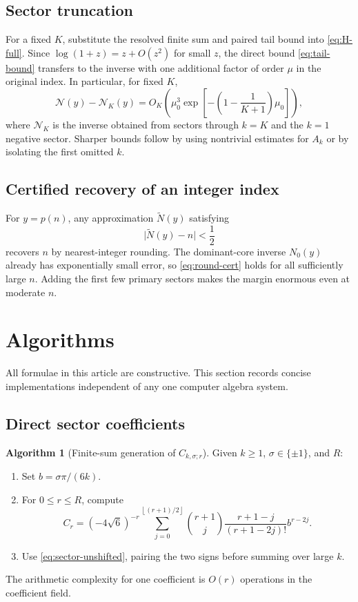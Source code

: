 \documentclass[11pt,a4paper]{article}
\numberwithin{equation}{section}
\theoremstyle{definition}
\newtheorem{algorithm}[theorem]{Algorithm}
\theoremstyle{remark}
\newcommand{\Ncal}{\mathcal N}
\newcommand{\abs}[1]{\lvert#1\rvert}
\newcommand{\floor}[1]{\left\lfloor#1\right\rfloor}
\begin{document}
\subsection{Sector truncation}

For a fixed $K$, substitute the resolved finite sum and paired tail bound into
\eqref{eq:H-full}.  Since $\log(1+z)=z+O(z^2)$ for small $z$, the direct bound
\eqref{eq:tail-bound} transfers to the inverse with one additional factor of
order $\mu$ in the original index.  In particular, for fixed $K$,
\begin{equation}\label{eq:inverse-K-bound}
 \Ncal(y)-\Ncal_K(y)
 =O_K\!\left(\mu_0^3
 \exp\!\left[-\left(1-\frac1{K+1}\right)\mu_0\right]\right),
\end{equation}
where $\Ncal_K$ is the inverse obtained from sectors through $k=K$ and the
$k=1$ negative sector.  Sharper bounds follow by using nontrivial estimates for
$A_k$ or by isolating the first omitted $k$.

\subsection{Certified recovery of an integer index}

For $y=p(n)$, any approximation $\widetilde N(y)$ satisfying
\begin{equation}\label{eq:round-cert}
 \abs{\widetilde N(y)-n}<\frac12
\end{equation}
recovers $n$ by nearest-integer rounding.  The dominant-core inverse $N_0(y)$
already has exponentially small error, so \eqref{eq:round-cert} holds for all
sufficiently large $n$.  Adding the first few primary sectors makes the margin
enormous even at moderate $n$.

\section{Algorithms}

All formulae in this article are constructive.  This section records concise
implementations independent of any one computer algebra system.

\subsection{Direct sector coefficients}

\begin{algorithm}[Finite-sum generation of $C_{k,\sigma;r}$]
Given $k\geq1$, $\sigma\in\{\pm1\}$, and $R$:
\begin{enumerate}[label=\arabic*.]
\item Set $b=\sigma\pi/(6k)$.
\item For $0\leq r\leq R$, compute
\[
 C_r=(-4\sqrt6)^{-r}\sum_{j=0}^{\floor{(r+1)/2}}
 \binom{r+1}{j}\frac{r+1-j}{(r+1-2j)!}b^{r-2j}.
\]
\item Use \eqref{eq:sector-unshifted}, pairing the two signs before summing over
      large $k$.
\end{enumerate}
The arithmetic complexity for one coefficient is $O(r)$ operations in the
coefficient field.
\end{algorithm}
\end{document}
